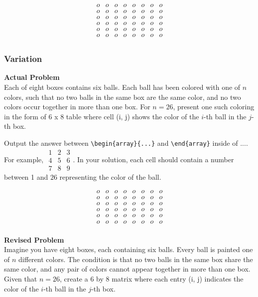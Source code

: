 $$\begin{array}{cccccccc}
o & o & o & o & o & o & o & o \\
o & o & o & o & o & o & o & o \\
o & o & o & o & o & o & o & o \\
o & o & o & o & o & o & o & o \\
o & o & o & o & o & o & o & o \\
o & o & o & o & o & o & o & o \\
\end{array}$$

\subsubsection{Variation}
\textbf{Actual Problem}\\
Each of eight boxes contains six balls. Each ball has been colored with one of $n$ colors, such that no two balls in the same box are the same color, and no two colors occur together in more than one box.
For $n=26$, present one such coloring in the form of 6 x 8 table where cell (i, j) shows the color of the $i$-th ball in the $j$-th box.

Output the answer between \verb|\begin{array}{...}| and \verb|\end{array}| inside of $\boxed{...}$. For example, $\boxed{\begin{array}{ccc}1 & 2 & 3 \\ 4 & 5 & 6 \\ 7 & 8 & 9\end{array}}$.
In your solution, each cell should contain a number between 1 and $26$ representing the color of the ball.

$$\begin{array}{cccccccc}
o & o & o & o & o & o & o & o \\
o & o & o & o & o & o & o & o \\
o & o & o & o & o & o & o & o \\
o & o & o & o & o & o & o & o \\
o & o & o & o & o & o & o & o \\
o & o & o & o & o & o & o & o \\
\end{array}$$


\textbf{Revised Problem}\\
Imagine you have eight boxes, each containing six balls. Every ball is painted one of \( n \) different colors. The condition is that no two balls in the same box share the same color, and any pair of colors cannot appear together in more than one box. Given that \( n = 26 \), create a 6 by 8 matrix where each entry (i, j) indicates the color of the \( i \)-th ball in the \( j \)-th box.

